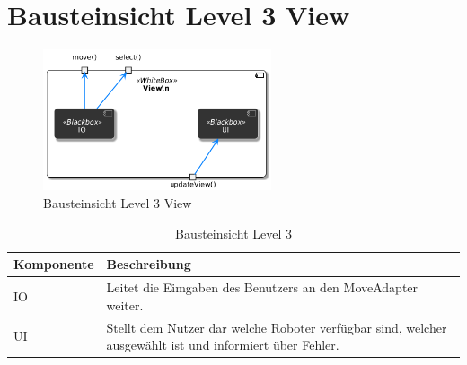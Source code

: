 \section{Bausteinsicht Level 3 View}
\begin{figure}[h] %
    \centering
    \includegraphics[width=0.6\textwidth]{diagrams/baustein_lvl_3_view.png}
    \caption{Bausteinsicht Level 3 View}
\end{figure}

\begin{table}[h!]
\centering
\begin{tabular}{|p{4cm}|p{9cm}|}
\hline
\textbf{Komponente} & \textbf{Beschreibung} \\ \hline
IO & Leitet die Eimgaben des Benutzers an den MoveAdapter weiter. \\ \hline
UI  & Stellt dem Nutzer dar welche Roboter verfügbar sind, welcher ausgewählt ist und informiert über Fehler.\\ \hline
\end{tabular}
\caption{Bausteinsicht Level 3}
\label{tab:lvl3}
\end{table}
